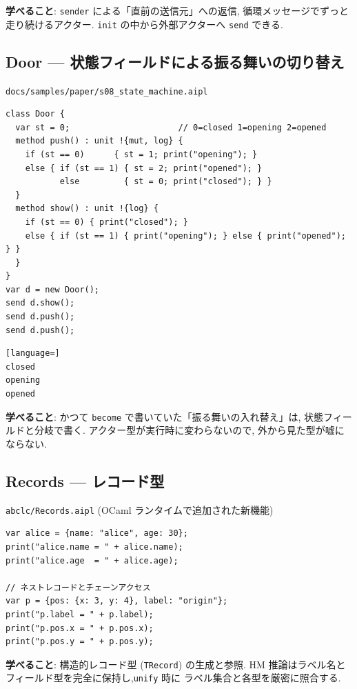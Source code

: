 \documentclass[11pt,a4paper]{article}
\begin{document}
\textbf{学べること}: \texttt{sender} による「直前の送信元」への返信,
循環メッセージでずっと走り続けるアクター. \texttt{init} の中から外部アクターへ \texttt{send} できる.

\subsection{Door --- 状態フィールドによる振る舞いの切り替え}

\texttt{docs/samples/paper/s08\_state\_machine.aipl}

\begin{lstlisting}
class Door {
  var st = 0;                      // 0=closed 1=opening 2=opened
  method push() : unit !{mut, log} {
    if (st == 0)      { st = 1; print("opening"); }
    else { if (st == 1) { st = 2; print("opened"); }
           else         { st = 0; print("closed"); } }
  }
  method show() : unit !{log} {
    if (st == 0) { print("closed"); }
    else { if (st == 1) { print("opening"); } else { print("opened"); } }
  }
}
var d = new Door();
send d.show();
send d.push();
send d.push();
\end{lstlisting}

\begin{lstlisting}[language=]
closed
opening
opened
\end{lstlisting}

\textbf{学べること}: かつて \texttt{become} で書いていた「振る舞いの入れ替え」は,
状態フィールドと分岐で書く. アクター型が実行時に変わらないので,
外から見た型が嘘にならない.

\subsection{Records --- レコード型}

\texttt{abclc/Records.aipl} (OCaml ランタイムで追加された新機能)

\begin{lstlisting}
var alice = {name: "alice", age: 30};
print("alice.name = " + alice.name);
print("alice.age  = " + alice.age);

// ネストレコードとチェーンアクセス
var p = {pos: {x: 3, y: 4}, label: "origin"};
print("p.label = " + p.label);
print("p.pos.x = " + p.pos.x);
print("p.pos.y = " + p.pos.y);
\end{lstlisting}

\textbf{学べること}: 構造的レコード型 (\texttt{TRecord}) の生成と参照.
HM 推論はラベル名とフィールド型を完全に保持し,\texttt{unify} 時に
ラベル集合と各型を厳密に照合する.
\end{document}
